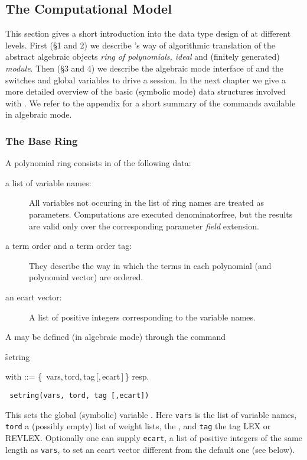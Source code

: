 \subsection{The Computational Model}

This section gives a short introduction into the data type design of
 at different levels. First (\S 1 and 2) we describe 's way
of algorithmic translation of the abstract algebraic objects
\emph{ring of polynomials, ideal} and (finitely generated) \emph{module}.
Then (\S 3 and 4) we describe the algebraic mode interface of 
and the switches and global variables to drive a session. In the next
chapter we give a more detailed overview of the basic (symbolic mode) data
structures involved with . We refer to the appendix for a short
summary of the commands available in algebraic mode.

\subsubsection{The Base Ring}

A polynomial ring consists in  of the following data:
\begin{description}
\item[\normalfont a list of variable names:]
All variables not occuring in the list of ring names are treated
as parameters. Computations are executed denominatorfree, but the
results are valid only over the corresponding parameter \emph{field}
extension.

\item[\normalfont a term order and a term order tag:]
They describe the way in which the terms in each polynomial (and
polynomial vector) are ordered.

\item[\normalfont an ecart vector:]
A list of positive integers corresponding to the variable
names.
\end{description}

A  may be defined (in algebraic mode) through the
command
\begin{syntax}
 \f{setring} 
\end{syntax}
with  ::= \{\, vars,\,tord,\,tag\,[,\,ecart\,]\,\} resp.
\begin{verbatim}
 setring(vars, tord, tag [,ecart])
\end{verbatim}
\hypertarget{command:SETRING}{}
This sets the global (symbolic) variable
. Here
\texttt{vars} is the list of variable names, \texttt{tord} a (possibly
empty) list of weight lists, the , and \texttt{tag}
the tag LEX or REVLEX. Optionally one can supply \texttt{ecart}, a list
of positive integers of the same length as \texttt{vars}, to set an ecart
vector different from the default one (see below).

